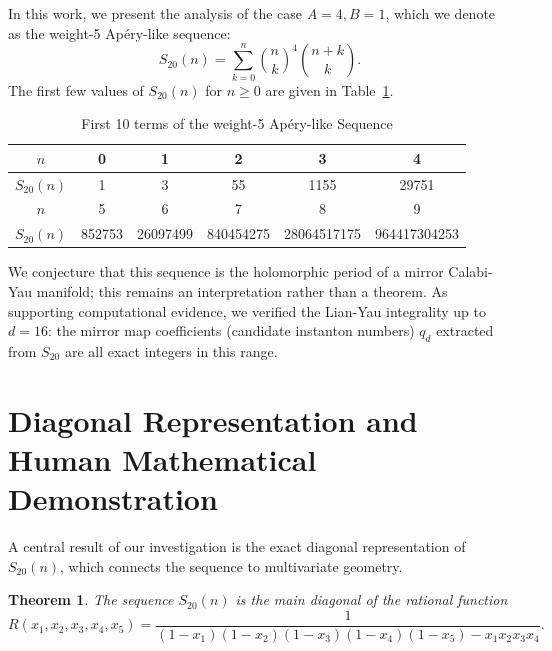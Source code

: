 \documentclass[11pt, a4paper]{article}
\newtheorem{theorem}{Theorem}
\begin{document}
In this work, we present the analysis of the case $A=4, B=1$, which we denote as the weight-5 Apéry-like sequence:
\begin{equation}
S_{20}(n) = \sum_{k=0}^n \binom{n}{k}^4 \binom{n+k}{k}.
\end{equation}
The first few values of $S_{20}(n)$ for $n \ge 0$ are given in Table~\ref{tab:s20}.
\begin{table}[h]
    \centering
    \begin{tabular}{|c|c|c|c|c|c|}
        \hline
        $n$ & 0 & 1 & 2 & 3 & 4 \\
        \hline
        $S_{20}(n)$ & 1 & 3 & 55 & 1155 & 29751 \\
        \hline
        \hline
        $n$ & 5 & 6 & 7 & 8 & 9 \\
        \hline
        $S_{20}(n)$ & 852753 & 26097499 & 840454275 & 28064517175 & 964417304253 \\
        \hline
    \end{tabular}
    \caption{First 10 terms of the weight-5 Apéry-like Sequence}
    \label{tab:s20}
\end{table}

We conjecture that this sequence is the holomorphic period of a mirror Calabi-Yau manifold; this remains an interpretation rather than a theorem. As supporting computational evidence, we verified the Lian-Yau integrality up to $d=16$: the mirror map coefficients (candidate instanton numbers) $q_d$ extracted from $S_{20}$ are all exact integers in this range.

\section{Diagonal Representation and Human Mathematical Demonstration}
A central result of our investigation is the exact diagonal representation of $S_{20}(n)$, which connects the sequence to multivariate geometry. 

\begin{theorem}
The sequence $S_{20}(n)$ is the main diagonal of the rational function
\begin{equation}
R(x_1, x_2, x_3, x_4, x_5) = \frac{1}{(1-x_1)(1-x_2)(1-x_3)(1-x_4)(1-x_5) - x_1 x_2 x_3 x_4}.
\end{equation}
\end{theorem}
\end{document}
